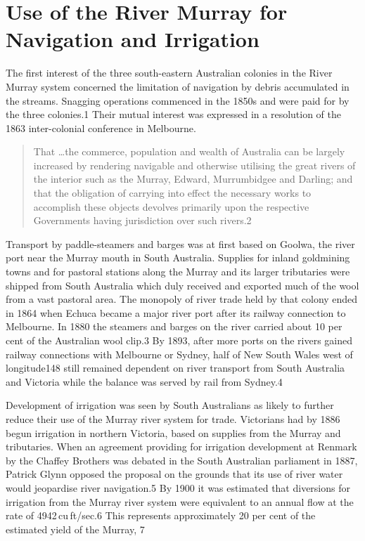 
\chapter{Use of the River Murray for Navigation and Irrigation}

The first interest of the three south-eastern Australian colonies in
the River Murray system concerned the limitation of navigation by
debris accumulated in the streams.  Snagging operations commenced in
the 1850s and were paid for by the three colonies.1 Their mutual
interest was expressed in a resolution of the 1863 inter-colonial
conference in Melbourne.
\begin{quote}
	That \ldots the commerce, population and wealth of Australia
	can be largely increased by rendering navigable and otherwise
	utilising the great rivers of the interior such as the Murray,
	Edward, Murrumbidgee and Darling; and that the obligation of
	carrying into effect the necessary works to accomplish these
	objects devolves primarily upon the respective Governments
	having jurisdiction over such rivers.2
\end{quote}

Transport by paddle-steamers and barges was at first based on Goolwa,
the river port near the Murray mouth in South Australia.  Supplies for
inland goldmining towns and for pastoral stations along the Murray and
its larger tributaries were shipped from South Australia which duly
received and exported much of the wool from a vast pastoral area.  The
monopoly of river trade held by that colony ended in 1864 when Echuca
became a major river port after its railway connection to Melbourne.
In 1880 the steamers and barges on the river carried about 10 per cent
of the Australian wool clip.3 By 1893, after more ports on the rivers
gained railway connections with Melbourne or Sydney, half of New South
Wales west of longitude148 still remained dependent on river transport
from South Australia and Victoria while the balance was served by rail
from Sydney.4

Development of irrigation was seen by South Australians as likely to
further reduce their use of the Murray river system for trade.
Victorians had by 1886 begun irrigation in northern Victoria, based on
supplies from the Murray and tributaries.  When an agreement providing
for irrigation development at Renmark by the Chaffey Brothers was
debated in the South Australian parliament in 1887, Patrick Glynn
opposed the proposal on the grounds that its use of river water would
jeopardise river navigation.5 By 1900 it was estimated that diversions
for irrigation from the Murray river system were equivalent to an
annual flow at the rate of 4942\,cu\,ft/sec.6 This represents
approximately 20 per cent of the estimated yield of the Murray, 7

